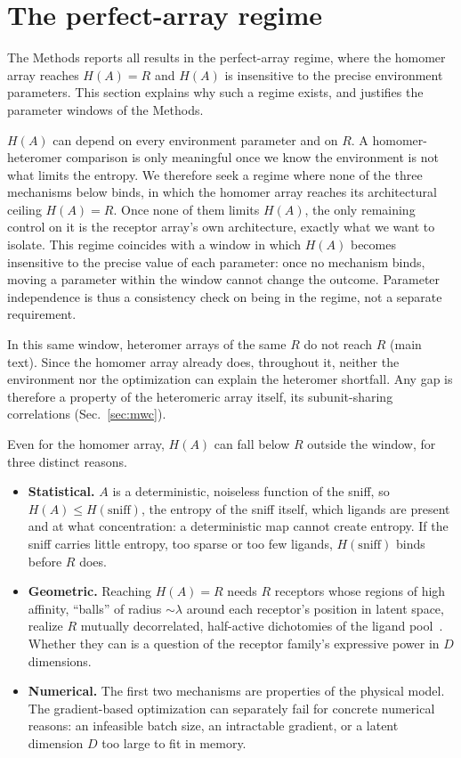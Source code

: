 \documentclass[aps,pre,superscriptaddress,floatfix,longbibliography,linenumbers]{revtex4-2}
\begin{document}
\section{The perfect-array regime}
\label{sec:perfect}

The Methods reports all results in the perfect-array regime, where the
homomer array reaches $H(A)=R$ and $H(A)$ is insensitive to the precise
environment parameters. This section explains why such a regime exists, and
justifies the parameter windows of the Methods.

$H(A)$ can depend on every environment parameter and on $R$. A
homomer-heteromer comparison is only meaningful once we know the environment
is not what limits the entropy. We therefore seek a regime where none of the
three mechanisms below binds, in which the homomer array reaches its
architectural ceiling $H(A)=R$. Once none of them limits $H(A)$, the only
remaining control on it is the receptor array's own architecture, exactly
what we want to isolate. This regime coincides with a window in which $H(A)$
becomes insensitive to the precise value of each parameter: once no mechanism
binds, moving a parameter within the window cannot change the outcome.
Parameter independence is thus a consistency check on being in the regime,
not a separate requirement.

In this same window, heteromer arrays of the same $R$ do not reach $R$ (main
text). Since the homomer array already does, throughout it, neither the
environment nor the optimization can explain the heteromer shortfall. Any gap
is therefore a property of the heteromeric array itself, its subunit-sharing
correlations (Sec.~\ref{sec:mwc}).

Even for the homomer array, $H(A)$ can fall below $R$ outside the window, for
three distinct reasons.

\begin{itemize}
\item \textbf{Statistical.} $A$ is a deterministic, noiseless function of the
sniff, so $H(A)\le H(\text{sniff})$, the entropy of the sniff itself, which
ligands are present and at what concentration: a deterministic map cannot
create entropy. If the sniff carries little entropy, too sparse or too few
ligands, $H(\text{sniff})$ binds before $R$ does.
\item \textbf{Geometric.} Reaching $H(A)=R$ needs $R$ receptors whose regions
of high affinity, ``balls'' of radius $\sim\lambda$ around each receptor's
position in latent space, realize $R$ mutually decorrelated, half-active
dichotomies of the ligand pool~\cite{zwicker_receptor_2016}. Whether they can
is a question of the receptor family's expressive power in $D$ dimensions.
\item \textbf{Numerical.} The first two mechanisms are properties of the
physical model. The gradient-based optimization can separately fail for
concrete numerical reasons: an infeasible batch size, an intractable
gradient, or a latent dimension $D$ too large to fit in memory.
\end{itemize}
\end{document}
